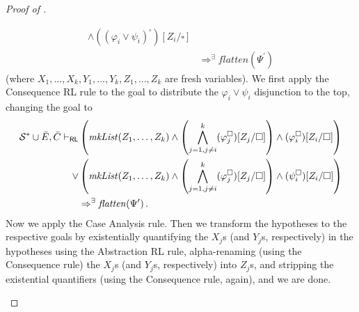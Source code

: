 \begin{proof}[Proof of ]
\begin{enumerate}
\begin{align*}
            \land ((\varphi_i \lor \psi_i)^\square)[Z_i/\square]
            \\ & \Rightarrow^\exists
            \mathit{flatten}(\Psi^\prime)
        \end{align*}
        (where $X_1,\ldots,X_k,Y_1,\ldots,Y_k,Z_1,\ldots,Z_k$ are fresh variables).
        We first apply the Consequence RL rule to the goal to distribute the $\varphi_i \lor \psi_i$ disjunction
        to the top, changing the goal to
        \begin{align*}
            \mathcal{S}^* \cup \Bar{E}, \Bar{C} \vdash_{\mathsf{RL}}
            &
            \left( \mathit{mkList}(Z_1, \ldots, Z_k) \land \left(\bigwedge_{j=1,j \not = i}^{k} (\varphi_j^\square)[Z_j/\square]\right)
            \land (\varphi_i^\square)[Z_i/\square] \right)
            \\ \lor &
            \left(
            \mathit{mkList}(Z_1, \ldots, Z_k) \land \left(\bigwedge_{j=1,j \not = i}^{k} (\varphi_j^\square)[Z_j/\square]\right)
            \land (\psi_i^\square)[Z_i/\square]
            \right)
            \\ & \Rightarrow^\exists
            \mathit{flatten}(\Psi^\prime) \, .
        \end{align*}
        Now we apply the Case Analysis rule.
        Then we transform the hypotheses to the respective goals by existentially quantifying the $X_j$s (and $Y_j$s, respectively)
        in the hypotheses
        using the Abstraction RL rule, alpha-renaming (using the Consequence rule) the $X_j$s (and $Y_j$s, respectively)
        into $Z_j$s, and stripping the existential quantifiers (using the Consequence rule, again), and we are done.
        

\end{enumerate}
\end{proof}
